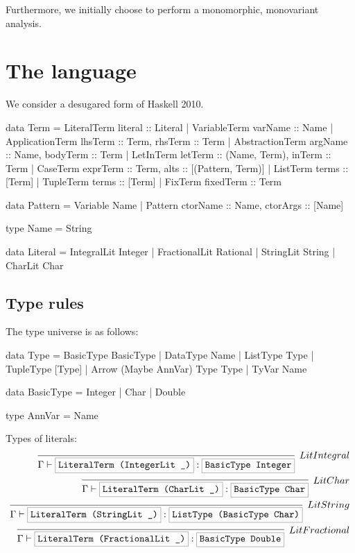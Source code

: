 \documentclass[a4paper]{scrartcl}
\newcommand{\hsterm}[1]{%
    \setlength{\fboxsep}{3pt}%
    \setlength{\fboxrule}{0.2pt}%
    \fbox{\texttt{#1}}}
\begin{document}
Furthermore, we initially choose to perform a monomorphic, monovariant analysis.

\section{The language}
We consider a desugared form of Haskell 2010.

\begin{code}
data Term = LiteralTerm     {literal :: Literal}
          | VariableTerm    {varName :: Name}
          | ApplicationTerm {lhsTerm :: Term, rhsTerm :: Term}
          | AbstractionTerm {argName :: Name, bodyTerm :: Term}
          | LetInTerm       {letTerm :: (Name, Term), inTerm :: Term}
          | CaseTerm        {exprTerm :: Term, alts :: [(Pattern, Term)]}
          | ListTerm        {terms :: [Term]}
          | TupleTerm       {terms :: [Term]}
          | FixTerm         {fixedTerm :: Term}

data Pattern = Variable Name
             | Pattern {ctorName :: Name, ctorArgs :: [Name]}

type Name = String

data Literal = IntegralLit Integer
             | FractionalLit Rational
             | StringLit String
             | CharLit Char
\end{code}

\subsection{Type rules}
The type universe is as follows:

\begin{code}
data Type = BasicType BasicType
          | DataType Name
          | ListType Type
          | TupleType [Type]
          | Arrow (Maybe AnnVar) Type Type
          | TyVar Name

data BasicType = Integer
               | Char
               | Double

type AnnVar = Name
\end{code}

Types of literals:
\begin{align*}
\infer[LitIntegral]%
    {\Gamma \vdash \hsterm{LiteralTerm (IntegerLit \_)} : \hsterm{BasicType Integer}}%
    {}\\
\infer[LitChar]%
    {\Gamma \vdash \hsterm{LiteralTerm (CharLit \_)} : \hsterm{BasicType Char}}%
    {}\\
\infer[LitString]%
    {\Gamma \vdash \hsterm{LiteralTerm (StringLit \_)} : \hsterm{ListType (BasicType Char)}}%
    {}\\
\infer[LitFractional]%
    {\Gamma \vdash \hsterm{LiteralTerm (FractionalLit \_)} : \hsterm{BasicType Double}}%
    {}\\
\end{align*}
\end{document}
